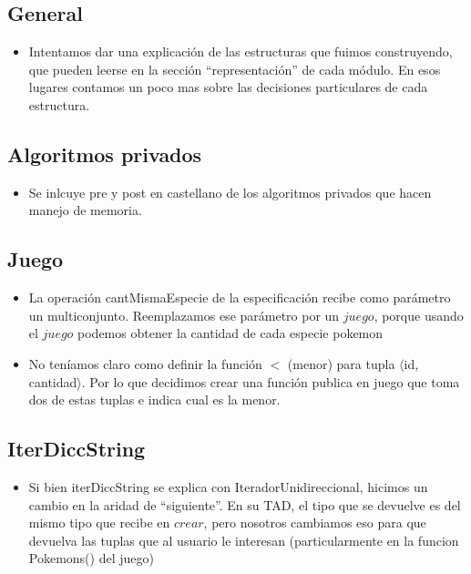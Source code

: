 
\subsection{General}

\begin{itemize}

\item{Intentamos dar una explicaci\'on de las estructuras que fuimos construyendo, que pueden leerse en la secci\'on ``representaci\'on'' de cada m\'odulo. En esos lugares contamos un poco mas sobre las decisiones particulares de cada estructura.}

\end{itemize}


\subsection{Algoritmos privados}

\begin{itemize}

\item{Se inlcuye pre y post en castellano de los algoritmos privados que hacen manejo de memoria.}

\end{itemize}


\subsection{Juego}

\begin{itemize}
\item{La operaci\'on cantMismaEspecie de la especificaci\'on recibe como par\'ametro un multiconjunto.
Reemplazamos ese par\'ametro por un $juego$, porque usando el $juego$ podemos obtener la cantidad de cada especie pokemon}

\item{No ten\'iamos claro como definir la funci\'on $<$ (menor) para tupla $\langle$id, cantidad$\rangle$. Por lo que decidimos crear una funci\'on publica en juego que toma dos de estas tuplas e indica cual es la menor.}

\end{itemize}


\subsection{IterDiccString}

\begin{itemize}

\item{Si bien iterDiccString se explica con IteradorUnidireccional, hicimos un cambio en la aridad de ``siguiente''. En su TAD, el tipo que se devuelve es del mismo tipo que recibe en $crear$, pero nosotros cambiamos eso para que devuelva las tuplas que al usuario le interesan (particularmente en la funcion Pokemons() del juego)}

\end{itemize}


